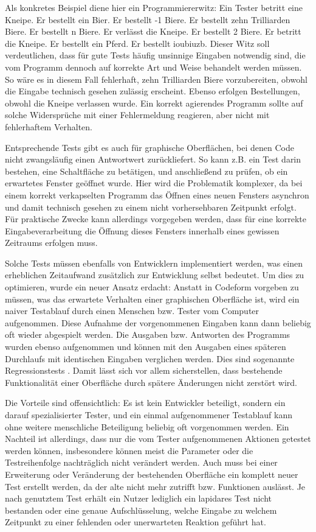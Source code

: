 Als konkretes Beispiel diene hier ein Programmiererwitz: Ein Tester betritt eine Kneipe.
Er bestellt ein Bier. Er bestellt -1 Biere. Er bestellt zehn Trilliarden Biere. Er bestellt n Biere.
Er verlässt die Kneipe. Er bestellt 2 Biere. Er betritt die Kneipe. Er bestellt ein Pferd. Er bestellt \glqq{}ioubiuzb\grqq{}.
Dieser Witz soll verdeutlichen, dass für gute Tests häufig unsinnige Eingaben notwendig sind,
die vom Programm dennoch auf korrekte Art und Weise behandelt werden müssen. So wäre es in diesem
Fall fehlerhaft, zehn Trilliarden Biere vorzubereiten, obwohl die Eingabe technisch gesehen zulässig erscheint.
Ebenso erfolgen Bestellungen, obwohl die Kneipe verlassen wurde. Ein korrekt agierendes
Programm sollte auf solche Widersprüche mit einer Fehlermeldung reagieren, aber nicht mit
fehlerhaftem Verhalten.

Entsprechende Tests gibt es auch für graphische Oberflächen, bei denen Code nicht zwangsläufig
einen Antwortwert zurückliefert. So kann z.B. ein Test darin bestehen, eine Schaltfläche zu betätigen,
und anschließend zu prüfen, ob ein erwartetes Fenster geöffnet wurde. Hier wird die Problematik
komplexer, da bei einem korrekt verkapselten Programm das Öffnen eines neuen Fensters asynchron
und damit technisch gesehen zu einem nicht vorhersehbaren Zeitpunkt erfolgt. Für praktische Zwecke
kann allerdings vorgegeben werden, dass für eine korrekte Eingabeverarbeitung die Öffnung dieses 
Fensters innerhalb eines gewissen Zeitraums erfolgen muss.

Solche Tests müssen ebenfalls von Entwicklern implementiert werden, was einen erheblichen
Zeitaufwand zusätzlich zur Entwicklung selbst bedeutet. Um dies zu optimieren, wurde ein neuer Ansatz erdacht: Anstatt
in Codeform vorgeben zu müssen, was das erwartete Verhalten einer graphischen Oberfläche ist,
wird ein naiver Testablauf durch einen Menschen bzw. Tester vom Computer aufgenommen. Diese Aufnahme der
vorgenommenen Eingaben kann dann beliebig oft wieder abgespielt werden. Die Ausgaben bzw.
Antworten des Programms wurden ebenso aufgenommen und können mit den Ausgaben eines späteren
Durchlaufs mit identischen Eingaben verglichen werden. Dies sind sogenannte 
\glqq{}Regressionstests\grqq{} \cite{regression}. Damit lässt sich vor allem sicherstellen,
dass bestehende Funktionalität einer Oberfläche durch spätere Änderungen nicht zerstört wird.

Die Vorteile sind offensichtlich: Es ist kein Entwickler beteiligt, sondern ein
darauf spezialisierter Tester, und ein einmal aufgenommener Testablauf kann ohne weitere
menschliche Beteiligung beliebig oft vorgenommen werden. Ein Nachteil ist allerdings, dass
nur die vom Tester aufgenommenen Aktionen getestet werden können, insbesondere können
meist die Parameter oder die Testreihenfolge nachträglich nicht verändert werden. Auch
muss bei einer Erweiterung oder Veränderung der bestehenden Oberfläche ein komplett neuer Test
erstellt werden, da der alte nicht mehr zutrifft bzw. Funktionen auslässt. Je nach genutztem
Test erhält ein Nutzer lediglich ein lapidares \glqq{}Test nicht bestanden\grqq{} oder
eine genaue Aufschlüsselung, welche Eingabe zu welchem Zeitpunkt zu einer fehlenden 
oder unerwarteten Reaktion geführt hat.


